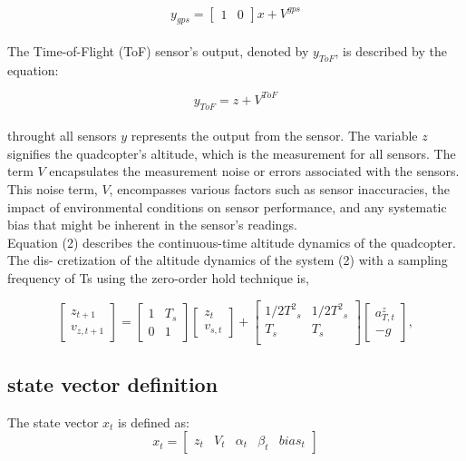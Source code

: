 \documentclass{article}
\begin{document}
\begin{equation}
y_{gps} =
\begin{bmatrix}
    1 & 0
\end{bmatrix}
x + V^{gps}
\end{equation}
\\

\noindent
The Time-of-Flight (ToF) sensor's output, denoted by \( y_{ToF} \), is described by the equation:

\begin{equation}
y_{ToF} = z + V^{ToF}
\end{equation}
\\

\noindent
throught all sensors \( y \) represents the output from the sensor. The variable \( z \) signifies the quadcopter's altitude, which is the measurement for all sensors. The term \( V \) encapsulates the measurement noise or errors associated with the sensors. This noise term, \( V \), encompasses various factors such as sensor inaccuracies, the impact of environmental conditions on sensor performance, and any systematic bias that might be inherent in the sensor's readings.
\\

\noindent
Equation (2) describes the continuous-time altitude dynamics of the quadcopter. The dis-
cretization of the altitude dynamics of the system (2) with a sampling frequency of Ts using the zero-order hold technique is,

\begin{equation}
\begin{bmatrix}
z_{t+1}\\
v_{z,t+1}
\end{bmatrix} =
\begin{bmatrix}
1 & T_s \\
0 & 1 
\end{bmatrix}
\begin{bmatrix}
z_t\\
v_{s,t}
\end{bmatrix} + 
\begin{bmatrix}
{1/2}{T^2}_s & {1/2}{T^2}_s \\
T_s & T_s \\ 
\end{bmatrix}
\begin{bmatrix}
a_{T,t}^z \\ 
-g
\end{bmatrix},
\end{equation}
\subsection{state vector definition}
The state vector \( x_t \) is defined as:
\begin{equation}
    x_t = 
    \begin{bmatrix}
        z_t &
        V_{t} & 
        \alpha_t & 
        \beta_t &
        bias_t 
    \end{bmatrix}
\end{equation}
\end{document}
